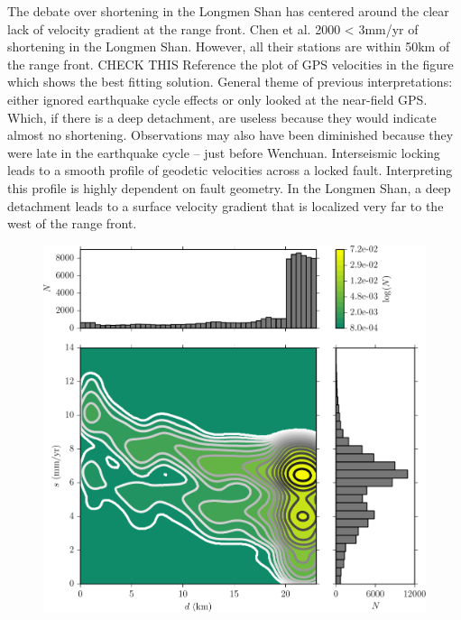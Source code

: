 \documentclass[12pt]{article}
\begin{document}
The debate over shortening in the Longmen Shan has centered around the clear lack of velocity gradient at the range front. 
Chen et al. 2000 < 3mm/yr of shortening in the Longmen Shan.
However, all their stations are within 50km of the range front. CHECK THIS
Reference the plot of GPS velocities in the figure which shows the best fitting solution.
General theme of previous interpretations: either ignored earthquake cycle effects or only looked at the near-field GPS.
Which, if there is a deep detachment, are useless because they would indicate almost no shortening.
Observations may also have been diminished because they were late in the earthquake cycle – just before Wenchuan.
Interseismic locking leads to a smooth profile of geodetic velocities across a locked fault.
Interpreting this profile is highly dependent on fault geometry.
In the Longmen Shan, a deep detachment leads to a surface velocity gradient that is localized very far to the west of the range front.

\begin{figure}[h!]
    \centering
    \includegraphics{figs/depth_slip_contour.pdf}
    \caption{}
    \label{fig:distribution}
\end{figure}
\end{document}
